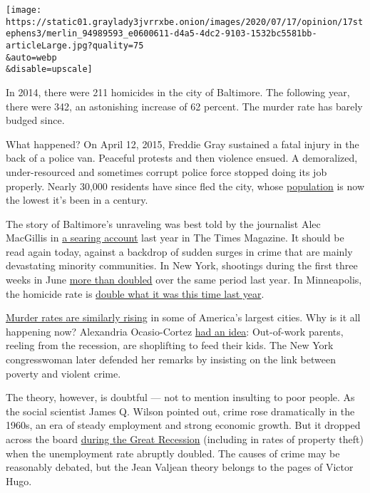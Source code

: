 \texttt{[image: https://static01.graylady3jvrrxbe.onion/images/2020/07/17/opinion/17stephens3/merlin\_94989593\_e0600611-d4a5-4dc2-9103-1532bc5581bb-articleLarge.jpg?quality=75\\\&auto=webp\\\&disable=upscale]}

In 2014, there were 211 homicides in the city of Baltimore. The
following year, there were 342, an astonishing increase of 62 percent.
The murder rate has barely budged since.

What happened? On April 12, 2015, Freddie Gray sustained a fatal injury
in the back of a police van. Peaceful protests and then violence ensued.
A demoralized, under-resourced and sometimes corrupt police force
stopped doing its job properly. Nearly 30,000 residents have since fled
the city, whose
\href{https://www.baltimoresun.com/maryland/baltimore-city/bs-md-ci-population-estimates-20200326-nebck2k2anbwrcfsbknphsfgwi-story.html}{population}
is now the lowest it's been in a century.

The story of Baltimore's unraveling was best told by the journalist Alec
MacGillis in
\href{https://www.nytimes3xbfgragh.onion/2019/03/12/magazine/baltimore-tragedy-crime.html}{a
searing account} last year in The Times Magazine. It should be read
again today, against a backdrop of sudden surges in crime that are
mainly devastating minority communities. In New York, shootings during
the first three weeks in June
\href{https://www.nytimes3xbfgragh.onion/2020/06/23/nyregion/nyc-shootings-surge.html?searchResultPosition=6}{more
than doubled} over the same period last year. In Minneapolis, the
homicide rate is
\href{https://www.startribune.com/as-gun-violence-continues-minneapolis-marchers-plead-for-peace/571713702/}{double
what it was this time last year}.

\href{https://www.nytimes3xbfgragh.onion/2020/07/06/upshot/murders-rising-crime-coronavirus.html}{Murder
rates are similarly rising} in some of America's largest cities. Why is
it all happening now? Alexandria Ocasio-Cortez
\href{https://www.nydailynews.com/news/politics/ny-ocasio-cortez-crime-nyc-shoplifting-bread-hungry-20200712-4ga4tm6vzze7ricmk2o2er4iwa-story.html}{had
an idea}: Out-of-work parents, reeling from the recession, are
shoplifting to feed their kids. The New York congresswoman later
defended her remarks by insisting on the link between poverty and
violent crime.

The theory, however, is doubtful --- not to mention insulting to poor
people. As the social scientist James Q. Wilson pointed out, crime rose
dramatically in the 1960s, an era of steady employment and strong
economic growth. But it dropped across the board
\href{https://www.city-journal.org/html/crime-and-great-recession-13399.html}{during
the Great Recession} (including in rates of property theft) when the
unemployment rate abruptly doubled. The causes of crime may be
reasonably debated, but the Jean Valjean theory belongs to the pages of
Victor Hugo.

